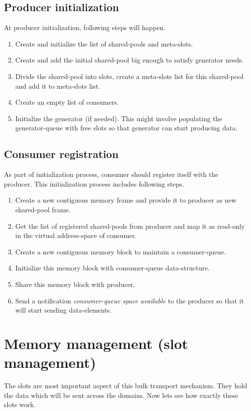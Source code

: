 \documentclass[a4paper,twoside]{report} %
\begin{document}
\subsection{Producer initialization}
At producer initialization, following steps will happen.
\begin{enumerate} 
  \item Create and initialize the list of shared-pools and meta-slots.
  \item Create and add the initial shared-pool big enough to satisfy 
  generator needs.  
  \item Divide the shared-pool into slots, create a meta-slots list
  for this shared-pool and add it to meta-slots list.
  \item Create an empty list of consumers.
  \item Initialize the generator (if needed).  This might involve
  populating the generator-queue with free slots so that generator can
  start producing data.
\end{enumerate} 



\subsection{Consumer registration}
As part of initialization process, consumer should register itself
with the producer.  This initialization process includes following 
steps.
\begin{enumerate}
  \item Create a new contiguous memory frame and provide it to
  producer as new shared-pool frame.
  \item Get the list of registered shared-pools from producer and 
  map it as read-only in the virtual address-space of consumer.
  \item Create a new contiguous memory block to maintain a 
  consumer-queue.
  \item Initialize this memory block with consumer-queue
  data-structure. 
  \item Share this memory block with producer.
  \item Send a notification \textit{consumer-queue space available} to
  the producer so that it will start sending data-elements.
\end{enumerate} 



\section{Memory management (slot management)}
\label{sec:memory-management}
The slots are most important aspect of this bulk transport mechanism.
They hold the data which will be sent across the domains.  Now lets
see how exactly these slots work.
\end{document}
